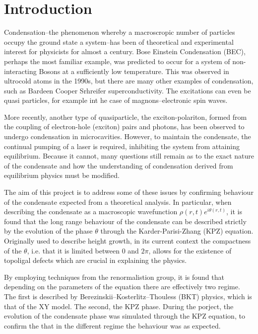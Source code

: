 \section{Introduction}

Condensation--the phenomenon whereby a macroscropic number of particles occupy the ground state a system--has been of theoretical and experimental interest for physicists for almost a century. Bose Einstein Condensation (BEC), perhaps the most familiar example, was predicted to occur for a system of non-interacting Bosons at a sufficiently low temperature. This was observed in ultrocold atoms in the 1990s, but there are many other examples of condensation, such as Bardeen Cooper Srhreifer superconductivity. The excitations can even be quasi particles, for example int he case of magnons--electronic spin waves.

More recently, another type of quasiparticle, the exciton-polariton, formed from the coupling of electron-hole (exciton) pairs and photons, has been observed to undergo condensation in microcavities. However, to maintain the condensate, the continual pumping of a laser is required, inhibiting the system from attaining equilibrium. Because it cannot, many questions still remain as to the exact nature of the condensate and how the understanding of condensation derived from equilibrium physics must be modified. 

The aim of this project is to address some of these issues by confirming behaviour of the condensate expected from a theoretical analysis. In particular, when describing the condensate as a macroscopic wavefunction $\rho(r,t)e^{i\theta(r,t)}$, it is found that the long range behaviour of the condensate can be described strictly by the evolution of the phase $\theta$ through the Karder-Parisi-Zhang (KPZ) equation. Originally used to describe height growth, in its current context the compactness of the $\theta$, i.e. that it is limited between $0$ and $2\pi$, allows for the existence of topoligal defects which are crucial in explaining the physics.

By employing techniques from the renormalistion group, it is found that depending on the parameters of the equation there are effectively two regime. The first is described by Berezinskii–Kosterlitz–Thouless (BKT) physics, which is that of the XY model. The second, the KPZ phase. 
During the porject, the evolution of the condensate phase was simulated through the KPZ equation, to confirm the that in the different regime the behaviour was as expected. 



 



